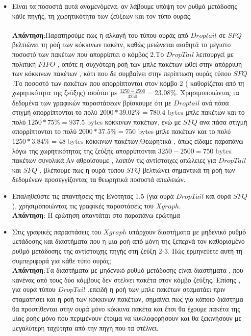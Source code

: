 \documentclass{article}%
\begin{document}
\begin{itemize}
\item Είναι τα ποσοστά αυτά αναμενόμενα, αν λάβουμε υπόψη τον ρυθμό μετάδοσης κάθε πηγής, τη
χωρητικότητα των ζεύξεων και τον τύπο ουράς;\\\\
\textbf{Απάντηση}:Παρατηρούμε πως η αλλαγή του τύπου ουράς από $Droptail$ σε $SFQ$ βελτιώνει τη ροή των κόκκινων πακέτν, καθώς μειώνεται αισθητά το μέγιστο ποσοστό των πακέτων που απορρίπτει ο κόμβος 2.Το $DropTail$ λειτουργεί με πολιτική $FIFO$ , οπότε η συχνότερη ροή των μπλε πακέτων ωθεί στην απόρριψη των κόκκινων πακέτων , κάτι που δε συμβαίνει στην περίπτωση ουράς τύπου $SFQ$.Το ποσοστό των πακέτων που απορρίπτονται στον κόμβο 2 ( καθορίζεται από τη χωρητικότητα της ζεύξης) ισούται με  $\frac{3250-2500}{3250}=23.08\%$. Χρησιμοποιώντας τα δεδομένα των γραφικών παραστάσεων βρίσκουμε ότι με $Droptail$ ανά πάσα στιγμή απορρίπτονται το πολύ $2000*39.02\% =780.4$ \textlatin{bytes} μπλε πακέτων και το πολύ $1250*75\%=937.5$ \textlatin{bytes} κόκκινων πακέτων, ενώ με $SFQ$ ανα πάσα στιγμή απορρίπτονται το πολύ $2000*37.5\%=750$ \textlatin{bytes} μπλε πακέτων και το πολύ $1250*3.84\%=48$ \textlatin{bytes} κόκκινων πακέτων.Θεωρητικά , όπως είδαμε παραπάνω λόγω της χωρητικότητας της ζεύξης απορρίπτονται $3250-2500=750$ \textlatin{bytes} πακέτων συνολικά.Αν αθροίσουμε , λοιπόν τις αντίστοιχες απώλειες για $DropTail$ και $SFQ$ , βλέπουμε πως η ουρά τύπου $SFQ$ βελτιώνει σημαντικά τη ροή των δεδομένων προσεγγίζοντας τα θεωρητικά ποσοστά απωλειών. \\
\item Επαληθεύστε τις απαντήσεις της Ενότητας 1.5 (για ουρά $DropTail$ και ουρά $SFQ$), χρησιµοποιώντας
τις γραφικές παραστάσεις του $Xgraph$.\\  
\textbf{Απάντηση}:	H ερώτηση απαντάται στο παραπάνω ερώτημα\\
\item  Στις γραφικές παραστάσεις του $Xgraph$ υπάρχουν διαστήματα με μηδενικό ρυθμό μετάδοσης και
διαστήματα που η μια ροή από μόνη της ξεπερνά τον καθορισμένο ρυθμό μετάδοσης της αντίστοιχης
πηγής στη ζεύξη 2-3. Πώς ερμηνεύετε αυτή τη συμπεριφορά για κάθε τύπο ουράς;\\
 \textbf{Απάντηση}:Τα διαστήματα με μηδενικό ρυθμό μετάδοσης είναι διαστήματα , που κανένας από τους δύο κόμβους δεν στέλνει πακέτα στον κόμβο ζεύξης. Επίσης , για ουρά τύπου $DropTail$ ,επειδή η ροή των μπλε πακέτων σταματάει πριν σταματήσει και η ροή των κόκκινων πακέτων, σημαίνει πως για κάποιο διάστημα θα προστίθενται στην ουρά μόνο κόκκινα πακέτα και έτσι θα έχουμε πακέτα της μίας ροής μόνο που περιμένουν έτοιμα να κυκλοφορήσουν και θα ξεκινήσουν με μεγαλύτερη ταχύτητα από την πηγή που τα στέλνει.\\

\end{itemize}
\end{document}
